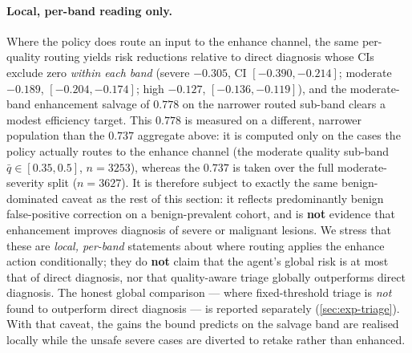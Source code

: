 \paragraph{Local, per-band reading only.}
Where the policy does route an input to the enhance channel, the same per-quality routing yields
risk reductions relative to direct diagnosis whose CIs exclude zero \emph{within each band}
(severe $-0.305$, CI $[-0.390,-0.214]$; moderate $-0.189$, $[-0.204,-0.174]$; high $-0.127$,
$[-0.136,-0.119]$),%
and the moderate-band enhancement salvage of $0.778$ on the narrower routed sub-band clears a
modest efficiency target. This $0.778$ is measured on a different, narrower population than the
$0.737$ aggregate above: it is computed only on the cases the policy actually routes to the enhance
channel (the moderate quality sub-band $\bar{q}\in[0.35,0.5]$, $n=3253$), whereas the $0.737$ is
taken over the full moderate-severity split ($n=3627$). It is therefore subject to exactly the same
benign-dominated caveat as the rest of this section: it reflects predominantly benign
false-positive correction on a benign-prevalent cohort, and is \textbf{not} evidence that
enhancement improves diagnosis of severe or malignant lesions. We stress that these are
\emph{local, per-band} statements about where routing applies the enhance action conditionally;
they do \textbf{not} claim that the agent's global risk is at most that of direct diagnosis, nor
that quality-aware triage globally outperforms direct diagnosis. The honest global comparison ---
where fixed-threshold triage is \emph{not} found to outperform direct diagnosis --- is reported
separately (\cref{sec:exp-triage}). With that caveat, the gains the bound predicts on the salvage
band are realised locally while the unsafe severe cases are diverted to retake rather than
enhanced.
